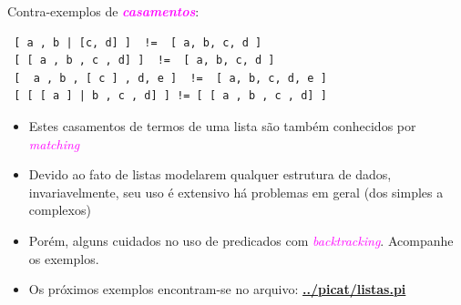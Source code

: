 \begin{frame}[fragile, allowframebreaks=0.9]
\begin{block}{Contra-exemplos de \textcolor{magenta}{{\em \textbf{casamentos}}}:}
\begin{verbatim}
 [ a , b | [c, d] ]  !=  [ a, b, c, d ]
 [ [ a , b , c , d] ]  !=  [ a, b, c, d ]
 [  a , b , [ c ] , d, e ]  !=  [ a, b, c, d, e ]
 [ [ [ a ] | b , c , d] ] != [ [ a , b , c , d] ]
 \end{verbatim}

\end{block}

\framebreak
\begin{itemize}
  \item Estes  casamentos de termos de uma lista
  são também conhecidos  por \textcolor{magenta}{{\em matching}} 

\item  Devido ao fato de listas modelarem
qualquer estrutura de dados, invariavelmente, seu uso  é extensivo
há  problemas em geral (dos simples a complexos)

\item Porém, alguns cuidados no uso de predicados com \textcolor{magenta}{\textit{backtracking}}.
 Acompanhe os exemplos.

\item Os próximos exemplos encontram-se no arquivo: \textcolor{red}{\textbf{\url{../picat/listas.pi}}}

\end{itemize}


\end{frame}



